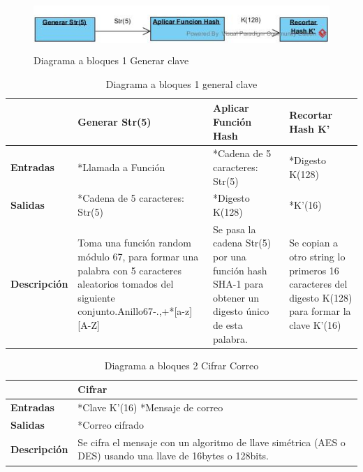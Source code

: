 \newpage
\newpage
\begin{figure}[H]
	\includegraphics[width=1\linewidth, height=2cm]{./images/bloques1.jpg}
	\caption{Diagrama a bloques 1 Generar clave}
	\label{fig:5-2-1}
\end{figure}
\begin{table}[H]
 \centering
   {
     \begin{tabular}{| p{4cm} | p{4cm} | p{4cm} | p{4cm} |}
     \hline
     & \textbf{Generar Str(5)} & \textbf{Aplicar Función Hash} & \textbf{Recortar Hash K’}\\
     \hline
     \textbf{Entradas} & *Llamada a Función & *Cadena de 5 caracteres: Str(5) & *Digesto K(128)\\
     \hline
     \textbf{Salidas} & *Cadena de 5 caracteres: Str(5) & *Digesto K(128) & *K’(16)\\
     \hline
     \textbf{Descripción} & Toma una función random módulo 67, para formar una palabra con 5 caracteres aleatorios tomados del siguiente conjunto.Anillo67{-.,+*[a-z][A-Z]} & Se pasa la cadena Str(5) por una función hash SHA-1 para obtener un digesto único de esta palabra. & Se copian a otro string lo primeros 16 caracteres del digesto K(128) para formar la clave K’(16)\\

    \end{tabular}
    }
    \caption{Diagrama a bloques 1 general clave}
    \label{tabla:b1}
\end{table}

\begin{table}[H]
 \centering
   {
     \begin{tabular}{| p{3cm} | p{3cm} |}
     \hline
     & \textbf{Cifrar}\\
     \hline
     \textbf{Entradas} & *Clave K’(16) *Mensaje de correo\\
     \hline
     \textbf{Salidas} & *Correo cifrado\\
     \hline
     \textbf{Descripción} & Se cifra el mensaje con un algoritmo de llave simétrica (AES o DES) usando una llave de 16bytes o 128bits.\\

    \end{tabular}
    }
    \caption{Diagrama a bloques 2 Cifrar Correo}
    \label{tabla:b2}
\end{table}

